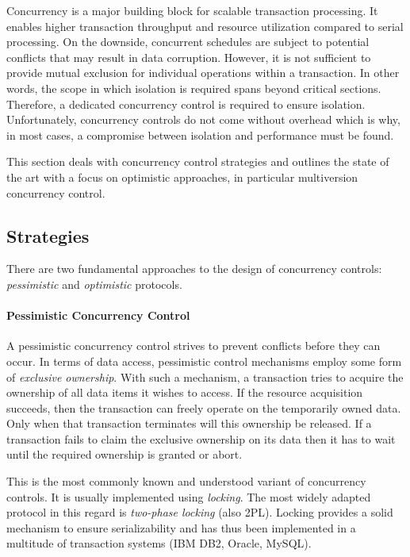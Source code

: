 Concurrency is a major building block for scalable transaction processing. It
enables higher transaction throughput and resource utilization compared to
serial processing. On the downside, concurrent schedules are subject to
potential conflicts that may result in data corruption. However, it is not
sufficient to provide mutual exclusion for individual operations within a
transaction. In other words, the scope in which isolation is required spans
beyond critical sections. Therefore, a dedicated concurrency control is required
to ensure isolation. Unfortunately, concurrency controls do not come without overhead which is why, in most cases, a compromise between isolation and performance must be found.

This section deals with concurrency control strategies and outlines the state of
the art with a focus on optimistic approaches, in particular multiversion
concurrency control.

\subsection{Strategies}

There are two fundamental approaches to the design of concurrency controls:
\emph{pessimistic} and \emph{optimistic} protocols.

\paragraph{Pessimistic Concurrency Control} %

A pessimistic concurrency control strives to prevent conflicts before they can
occur. In terms of data access, pessimistic control mechanisms employ some form
of \emph{exclusive ownership}. With such a mechanism, a transaction tries to
acquire the ownership of all data items it wishes to access. If the resource
acquisition succeeds, then the transaction can freely operate on the temporarily
owned data. Only when that transaction terminates will this ownership be
released. If a transaction fails to claim the exclusive ownership on its data
then it has to wait until the required ownership is granted or abort.

This is the most commonly known and understood variant of concurrency controls.
It is usually implemented using \emph{locking}. The most widely adapted protocol
in this regard is \emph{two-phase locking} (also 2PL). Locking provides a solid
mechanism to ensure serializability and has thus been implemented in a multitude
of transaction systems (IBM DB2, Oracle, MySQL).

